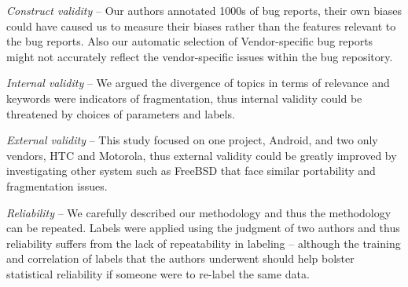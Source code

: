 \documentclass[10pt, conference, compsocconf]{IEEEtran}
\begin{document}
\textit{Construct validity} – 
Our authors annotated 1000s of bug reports, their own biases could
have caused us to measure their biases rather than the features
relevant to the bug reports.
Also our automatic selection of Vendor-specific bug reports
might not accurately reflect the vendor-specific issues within the
bug repository.


\textit{Internal validity} – We argued the divergence of topics in
terms of relevance and keywords were indicators of fragmentation, thus
internal validity could be threatened by choices of parameters and labels.


\textit{External validity} – This study focused on one project,
Android, and two only vendors, HTC and Motorola, thus external
validity could be greatly improved by investigating other system such
as FreeBSD that face similar portability and fragmentation issues.

\textit{Reliability} – 
We carefully described our methodology and thus the methodology can be
repeated. Labels were applied using the judgment of two authors and
thus reliability suffers from the lack of repeatability in labeling --
although the training and correlation of labels that the authors
underwent should help bolster statistical reliability if someone were to
re-label the same data.
\end{document}
